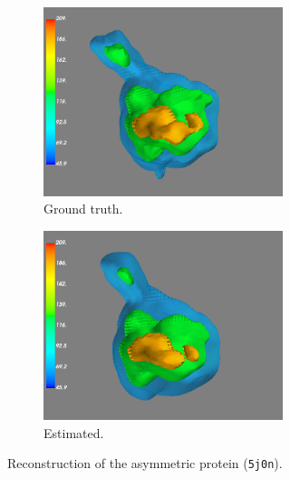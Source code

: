 \begin{figure}
    \centering
    \begin{subfigure}[b]{0.45\textwidth}
        \includegraphics[height=5.5cm]{images/5j0n_reconstruction_GT.png}
        \caption{Ground truth.}
    \end{subfigure}
    \hfill
    \begin{subfigure}[b]{0.5\textwidth}
    \centering
        \includegraphics[height=5.5cm]{images/5j0n_reconstruction_noise0.png}
        \caption{Estimated.}
    \end{subfigure}
    \caption{
        Reconstruction of the asymmetric protein (\texttt{5j0n}).
    }\label{fig:reconstruction-noise0}
\end{figure}


